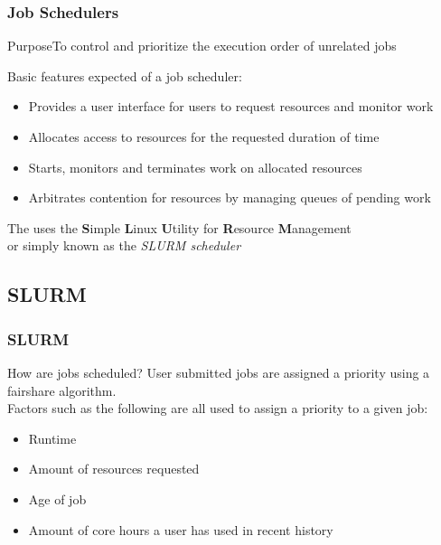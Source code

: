 \begin{frame}
  \frametitle{Job Schedulers}
  \begin{block}{Purpose}To control and prioritize the execution order of unrelated jobs\end{block}
	Basic features expected of a job scheduler:
	\begin{itemize}\footnotesize
        \item Provides a user interface for users to request resources and monitor work 
        \item Allocates access to resources for the requested duration of time
	\item Starts, monitors and terminates work on allocated resources
	\item Arbitrates contention for resources by managing queues of pending work
	\end{itemize}
	\bigskip
        The {\craycs} uses the \textbf{S}imple \textbf{L}inux \textbf{U}tility for \textbf{R}esource \textbf{M}anagement~\\ or simply known as the \emph{SLURM scheduler}
\end{frame}

\subsection{SLURM}
\begin{frame}
\frametitle{SLURM}
\begin{block}{How are jobs scheduled?}
User submitted jobs are assigned a priority using a fairshare algorithm.\\
Factors such as the following are all used to assign a priority to a given job: 
\begin{itemize}
\item Runtime
\item Amount of resources requested
\item Age of job
\item Amount of core hours a user has used in recent history
\end{itemize}

\end{block}
\end{frame}

